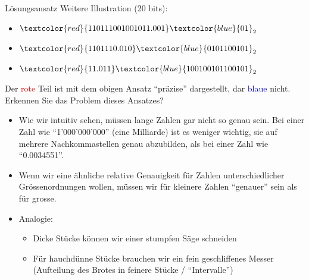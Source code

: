 \begin{frame}{Lösungsansatz}
Weitere Illustration (20 bits):
\begin{itemize}
\tiny
    \item $\textcolor{red}{110111001001011.001 }\textcolor{blue}{01}_2$
    \item $\textcolor{red}{1101110.010}\textcolor{blue}{0101100101}_2$
    \item $\textcolor{red}{11.011}\textcolor{blue}{100100101100101}_2$
\end{itemize}\normalsize
Der \textcolor{red}{rote} Teil ist mit dem obigen Ansatz \enquote{präzise} dargestellt, dar \textcolor{blue}{blaue} nicht. Erkennen Sie das Problem dieses Ansatzes?

\begin{itemize}
    \item Wie wir intuitiv sehen, müssen lange Zahlen gar nicht so genau sein. Bei einer Zahl wie ``1'000'000'000'' (eine Milliarde) ist es weniger wichtig, sie auf mehrere Nachkommastellen genau abzubilden, als bei einer Zahl wie ``0.0034551''. 
    \item Wenn wir eine ähnliche relative Genauigkeit für Zahlen unterschiedlicher Grössenordnungen wollen, müssen wir für kleinere Zahlen ``genauer'' sein als für grosse.
    \item Analogie: 
    \begin{itemize}
        \item {} Dicke Stücke können wir einer stumpfen Säge schneiden 
        \item {} Für hauchdünne Stücke brauchen wir ein fein geschliffenes Messer (Aufteilung des Brotes in feinere Stücke / ``Intervalle'')
    \end{itemize}
\end{itemize}
\end{frame}

